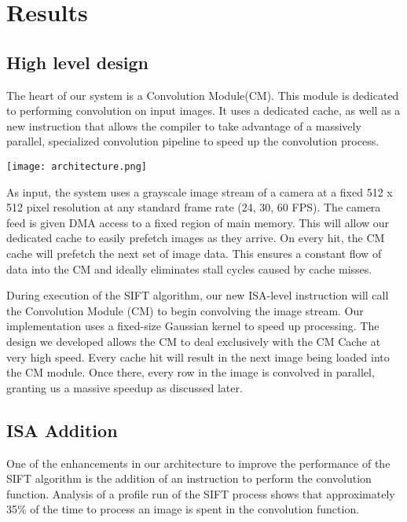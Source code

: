 \section{Results}

\subsection{High level design}
The heart of our system is a Convolution Module(CM).  This module is dedicated to performing convolution on input images.  It uses a dedicated cache, as well as a new instruction that allows the compiler to take advantage of a massively parallel, specialized convolution pipeline to speed up the convolution process.

\begin{center}
\texttt{[image: architecture.png]}%
\label{fig:architecture}%
\end{center}

As input, the system uses a grayscale image stream of a camera at a fixed 512 x 512 pixel resolution at any standard frame rate (24, 30, 60 FPS). The camera feed is given DMA access to a fixed region of main memory. This will allow our dedicated cache to easily prefetch images as they arrive. On every hit, the CM cache will prefetch the next set of image data. This ensures a constant flow of data into the CM and ideally eliminates stall cycles caused by cache misses.  

During execution of the SIFT algorithm, our new ISA-level instruction will call the Convolution Module (CM) to begin convolving the image stream. Our implementation uses a fixed-size Gaussian kernel to speed up processing.  The design we developed  allows the CM to deal exclusively with the CM Cache at very high speed. Every cache hit will result in the next image being loaded into the CM module. Once there, every row in the image is convolved in parallel, granting us a massive speedup as discussed later.


\subsection{ISA Addition}
One of the enhancements in our architecture to improve the performance of the SIFT algorithm is the addition of an instruction to perform the convolution function. Analysis of a profile run of the SIFT process shows that approximately 35\% of the time to process an image is spent in the convolution function.

